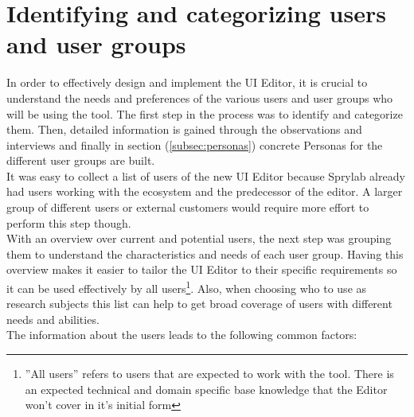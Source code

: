 \section{Identifying and categorizing users and user groups}
\label{sec:user-groups}
In order to effectively design and implement the UI Editor, it is crucial to understand the needs and preferences of the various users and user groups who will be using the tool.
The first step in the process was to identify and categorize them.
Then, detailed information is gained through the observations and interviews and finally in section (\ref{subsec:personas}) concrete Personas for the different user groups are built.
\\
It was easy to collect a list of users of the new UI Editor because Sprylab already had users working with the ecosystem and the predecessor of the editor.
A larger group of different users or external customers would require more effort to perform this step though.
\\
With an overview over current and potential users, the next step was grouping them to understand the characteristics and needs of each user group.
Having this overview makes it easier to tailor the UI Editor to their specific requirements so it can be used effectively by all users\footnote{''All users'' refers to users that are expected to work with the tool. There is an expected technical and domain specific base knowledge that the Editor won't cover in it's initial form}.
Also, when choosing who to use as research subjects this list can help to get broad coverage of users with different needs and abilities.
\\
The information about the users leads to the following common factors:
